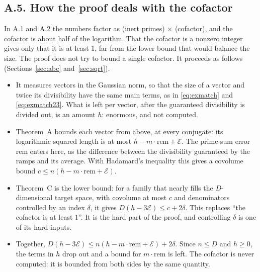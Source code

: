\documentclass[11pt]{amsart}
\numberwithin{equation}{section}
\theoremstyle{definition}
\theoremstyle{remark}
\begin{document}
\subsection*{A.5. How the proof deals with the cofactor}
In A.1 and A.2 the numbers factor as (inert primes) $\times$ (cofactor), and the cofactor is about half of the logarithm. That the cofactor is a nonzero integer gives only that it is at least $1$, far from the lower bound that would balance the size. The proof does not try to bound a single cofactor. It proceeds as follows (Sections~\ref{sec:abc} and~\ref{sec:sqrt}).
\begin{itemize}[leftmargin=2em]
\item It measures vectors in the Gaussian norm, so that the size of a vector and twice its divisibility have the same main terms, as in \eqref{eq:exmatch} and \eqref{eq:exmatch23}. What is left per vector, after the guaranteed divisibility is divided out, is an amount $h$: enormous, and not computed.
\item Theorem~A bounds each vector from above, at every conjugate: its logarithmic squared length is at most $h-m\cdot\mathrm{rem}+\mathcal E$. The prime-sum error $\mathrm{rem}$ enters here, as the difference between the divisibility guaranteed by the ramps and its average. With Hadamard's inequality this gives a covolume bound $c\le n(h-m\cdot\mathrm{rem}+\mathcal E)$.
\item Theorem~C is the lower bound: for a family that nearly fills the $D$-dimensional target space, with covolume at most $c$ and denominators controlled by an index $\delta$, it gives $D(h-3\mathcal E)\le c+2\delta$. This replaces ``the cofactor is at least $1$''. It is the hard part of the proof, and controlling $\delta$ is one of its hard inputs.
\item Together, $D(h-3\mathcal E)\le n(h-m\cdot\mathrm{rem}+\mathcal E)+2\delta$. Since $n\le D$ and $h\ge0$, the terms in $h$ drop out and a bound for $m\cdot\mathrm{rem}$ is left. The cofactor is never computed: it is bounded from both sides by the same quantity.
\end{itemize}
\end{document}
